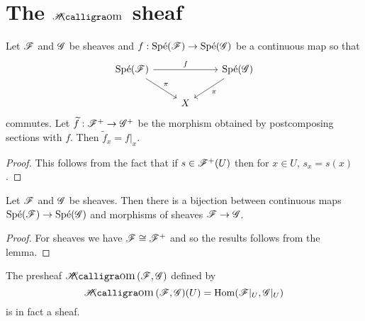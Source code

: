 \documentclass{memoir}
\begin{document}
\section{The \texorpdfstring{$\sheafHom$}{Hom} sheaf}
\begin{lemma}
    Let $\mathscr{F}$ and $\mathscr{G}$ be sheaves and $f:\text{Sp\'e}(\mathscr{F})\to \text{Sp\'e}(\mathscr{G})$ be a continuous map so that 
    \begin{equation}
        \begin{tikzcd}
            \Spe(\shf{F}) \arrow[rr, "f"] \arrow[rd,"\pi"] & & \Spe(\shf{G}) \arrow[dl,"\pi"] \\
                                                  & X &
        \end{tikzcd}
    \end{equation}
    commutes.
    Let $\widetilde f: \mathscr{F}^+\to\mathscr{G}^+$ be the morphism obtained by postcomposing sections with $f$.
    Then $\tilde f_x = f|_x$.
    
\end{lemma}
\begin{proof}
    This follows from the fact that if $s\in\mathscr{F}^+(U)$ then for $x\in U$, $s_x = s(x)$.
\end{proof}
\begin{thm}
    Let $\mathscr{F}$ and $\mathscr{G}$ be sheaves.
    Then there is a bijection between continuous maps $\text{Sp\'e}(\mathscr{F})\to \text{Sp\'e}(\mathscr{G})$ and morphisms of sheaves $\mathscr{F}\to \mathscr{G}$.
\end{thm}
\begin{proof}
    For sheaves we have $\mathscr{F} \cong \mathscr{F}^+$ and so the results follows from the lemma.
\end{proof}
\begin{corollary}
    The presheaf $\sheafHom(\shf{F},\shf{G})$ defined by 
    \begin{equation}
        \sheafHom(\shf{F},\shf{G})(U) = \Hom(\shf{F}|_U,\shf{G}|_U)
    \end{equation}
    is in fact a sheaf.
\end{corollary}
\end{document}
